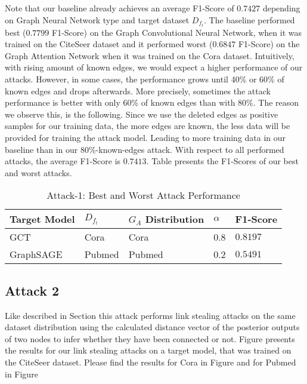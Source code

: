             Note that our baseline already achieves an average F1-Score of $0.7427$ depending on Graph Neural Network type and target dataset $D_{f_t}$.
            The baseline performed best ($0.7799$ F1-Score) on the Graph Convolutional Neural Network, when it was trained on the  CiteSeer dataset and it performed worst ($0.6847$ F1-Score) on the Graph Attention Network when it was trained on the Cora dataset.
            Intuitively, with rising amount of known edges, we would expect a higher performance of our attacks.
            However, in some cases, the performance grows until 40\% or 60\% of known edges and drops afterwards.
            More precisely, sometimes the attack performance is better with only 60\% of known edges than with 80\%.
            The reason we observe this, is the following. 
            Since we use the deleted edges as positive samples for our training data, the more edges are known, the less data will be provided for training the attack model. 
            Leading to more training data in our baseline than in our 80\%-known-edges attack.
            With respect to all performed attacks, the average F1-Score is $0.7413$.
            Table  presents the F1-Scores of our best and worst attacks.

            \vspace{0.48cm}
            \begin{table}[!h]
                \centering
                \footnotesize
                \begin{tabular}{l|l|l|l|l|}
                \toprule
                Target Model & $D_{f_t}$ & $G_A$ Distribution & $\alpha$ & F1-Score \\
                \midrule
                GCT       & Cora   & Cora   & 0.8 & $0.8197$ \\
                GraphSAGE & Pubmed & Pubmed & 0.2 & $0.5491$ \\
                
                \bottomrule
                \end{tabular}
                \caption{Attack-1: Best and Worst Attack Performance}
                \label{table:attack1-best-and-worst-performance}
            \end{table}

        \subsection*{Attack 2}
            Like described in Section  this attack performs link stealing attacks on the same dataset distribution using the calculated distance vector of the posterior outputs of two nodes to infer whether they have been connected or not. 
            Figure  presents the results for our link stealing attacks on a target model, that was trained on the CiteSeer dataset.
            Please find the results for Cora in Figure  and for Pubmed in Figure 


